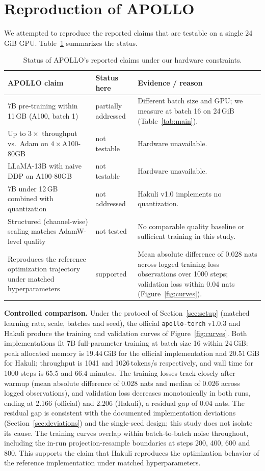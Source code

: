 \documentclass[11pt]{article}
\begin{document}
\section{Reproduction of APOLLO}
\label{sec:reproduction}

We attempted to reproduce the reported claims that are testable on a single
24\,GiB GPU. Table~\ref{tab:claims} summarizes the status.

\begin{table}[t]
\centering
\small
\begin{tabular}{p{}p{}p{}}
\toprule
APOLLO claim & Status here & Evidence / reason \\
\midrule
7B pre-training within 11\,GB (A100, batch 1) & partially addressed &
Different batch size and GPU; we measure at batch 16 on 24\,GiB (Table~\ref{tab:main}). \\
Up to $3\times$ throughput vs.\ Adam on $4\times$A100-80GB & not testable &
Hardware unavailable. \\
LLaMA-13B with naive DDP on A100-80GB & not testable & Hardware unavailable. \\
7B under 12\,GB combined with quantization & not addressed &
Hakuli v1.0 implements no quantization. \\
Structured (channel-wise) scaling matches AdamW-level quality & not tested &
No comparable quality baseline or sufficient training in this study. \\
Reproduces the reference optimization trajectory under matched hyperparameters & supported &
Mean absolute difference of 0.028 nats across logged training-loss observations over 1000 steps; validation loss within 0.04 nats (Figure~\ref{fig:curves}). \\
\bottomrule
\end{tabular}
\caption{Status of APOLLO's reported claims under our hardware constraints.}
\label{tab:claims}
\end{table}

\textbf{Controlled comparison.} Under the protocol of Section~\ref{sec:setup}
(matched learning rate, scale, batches and seed), the official
\texttt{apollo-torch} v1.0.3 and Hakuli produce the training and validation
curves of Figure~\ref{fig:curves}. Both implementations fit 7B
full-parameter training at batch size 16 within 24\,GiB: peak allocated
memory is 19.44\,GiB for the official implementation and 20.51\,GiB for
Hakuli; throughput is 1041 and 1026\,tokens/s respectively, and wall time
for 1000 steps is 65.5 and 66.4 minutes. The training losses track
closely after warmup (mean absolute difference of 0.028 nats and median of
0.026 across logged observations),
and validation loss decreases monotonically in both runs, ending at 2.166
(official) and 2.206 (Hakuli), a residual gap of 0.04 nats. The residual gap
is consistent with the documented implementation deviations
(Section~\ref{sec:deviations}) and the single-seed design; this study does
not isolate its cause. The training
curves overlap within batch-to-batch noise throughout, including the in-run
projection-resample boundaries at steps 200, 400, 600 and 800. This
supports the claim that Hakuli reproduces the optimization behavior of the
reference implementation under matched hyperparameters.
\end{document}
